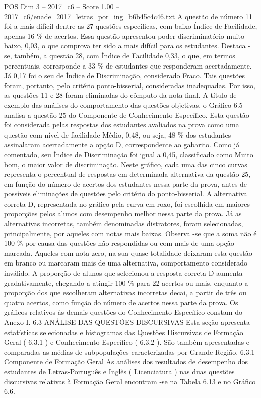 \begin{textsample}{POS Dim 3 – 2017\_c6 – Score 1.00 – 2017\_c6/enade\_2017\_letras\_por\_ing\_b6b45c4c46.txt}
A questão de número 11 foi a mais difícil dentre as 27 questões específicas, com baixo Índice de Facilidade, apenas 16 \% de acertos.
Essa questão apresentou poder discriminatório muito baixo, 0,03, o que comprova ter sido a mais difícil para os estudantes.
Destaca -se, também, a questão 28, com Índice de Facilidade 0,33, o que, em termos percentuais, corresponde a 33 \% de estudantes que responderam acertadamente.
Já 0,17 foi o seu de Índice de Discriminação, considerado Fraco.
Tais questões foram, portanto, pelo critério ponto-bisserial, consideradas inadequadas.
Por isso, as questões 11 e 28 foram eliminadas do cômputo da nota final.
A título de exemplo das análises do comportamento das questões objetivas, o Gráfico 6.5 analisa a questão 25 do Componente de Conhecimento Específico.
Esta questão foi considerada pelas respostas dos estudantes avaliados na prova como uma questão com nível de facilidade Médio, 0,48, ou seja, 48 \% dos estudantes assinalaram acertadamente a opção D, correspondente ao gabarito.
Como já comentado, seu Índice de Discriminação foi igual a 0,45, classificado como Muito bom, o maior valor de discriminação.
Neste gráfico, cada uma das cinco curvas representa o percentual de respostas em determinada alternativa da questão 25, em função do número de acertos dos estudantes nessa parte da prova, antes de possíveis eliminações de questões pelo critério do ponto-bisserial.
A alternativa correta D, representada no gráfico pela curva em roxo, foi escolhida em maiores proporções pelos alunos com desempenho melhor nessa parte da prova.
Já as alternativas incorretas, também denominadas distratores, foram selecionadas, principalmente, por aqueles com notas mais baixas.
Observa -se que a soma não é 100 \% por causa das questões não respondidas ou com mais de uma opção marcada.
Aqueles com nota zero, na sua quase totalidade deixaram esta questão em branco ou marcaram mais de uma alternativa, comportamento considerado inválido.
A proporção de alunos que selecionou a resposta correta D aumenta gradativamente, chegando a atingir 100 \% para 22 acertos ou mais, enquanto a proporção dos que escolheram alternativas incorretas decai, a partir de três ou quatro acertos, como função do número de acertos nessa parte da prova.
Os gráficos relativos às demais questões do Conhecimento Específico constam do Anexo I. 6.3 ANÁLISE DAS QUESTÕES DISCURSIVAS Esta seção apresenta estatísticas selecionadas e histogramas das Questões Discursivas de Formação Geral ( 6.3.1 ) e Conhecimento Específico ( 6.3.2 ).
São também apresentadas e comparadas as médias de subpopulações caracterizadas por Grande Região. 6.3.1 Componente de Formação Geral As análises dos resultados de desempenho dos estudantes de Letras-Português e Inglês ( Licenciatura ) nas duas questões discursivas relativas à Formação Geral encontram -se na Tabela 6.13 e no Gráfico 6.6.

\end{textsample}
